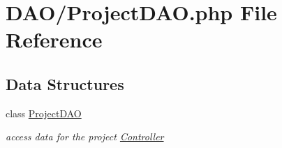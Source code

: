 \hypertarget{_project_d_a_o_8php}{}\section{D\+A\+O/\+Project\+D\+AO.php File Reference}
\label{_project_d_a_o_8php}
\subsection*{Data Structures}
\begin{DoxyCompactItemize}
\item 
class \hyperlink{class_project_d_a_o}{Project\+D\+AO}
\begin{DoxyCompactList}\small\item\em access data for the project \hyperlink{class_controller}{Controller} \end{DoxyCompactList}\end{DoxyCompactItemize}
